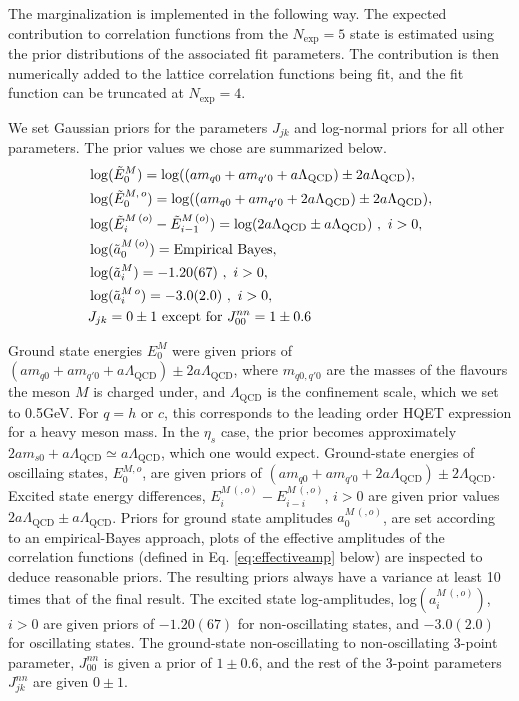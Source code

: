 The marginalization is implemented in the following way. The expected contribution to correlation functions from the $N_{\text{exp}}=5$ state is estimated using the prior distributions of the associated fit parameters. The contribution is then numerically added to the lattice correlation functions being fit, and the fit function can be truncated at $N_{\text{exp}}=4$.

We set Gaussian priors for the parameters $J_{jk}$ and log-normal priors for all other parameters. The prior values we chose are summarized below.
\begin{align}
  \nonumber
  &\log(\tilde{E}_0^M) = \log( (am_{q0}+am_{q'0}+a\Lambda_{\text{QCD}})\pm 2a\Lambda_{\text{QCD}} ), \\
  \nonumber
  &\log(\tilde{E}_0^{M,\,o}) = \log( (am_{q0}+am_{q'0}+2a\Lambda_{\text{QCD}})\pm 2a\Lambda_{\text{QCD}} ), \\
  \nonumber
  &\log(\tilde{E}_i^{M\, (o)} - \tilde{E}_{i-1}^{M\, (o)}) = \log( 2a\Lambda_{\text{QCD}} \pm a\Lambda_{\text{QCD}}) \,\,,\,\,i>0 , \\
  \nonumber
  &\log(\tilde{a}_0^{M\,(o)}) = \text{Empirical Bayes}, \\
  \nonumber
  &\log(\tilde{a}_i^{M}) = -1.20(67) \,\,,\,\,i>0, \\
  \nonumber
  &\log(\tilde{a}_i^{M\,o}) = -3.0(2.0) \,\,,\,\,i>0, \\
  &J_{jk} = 0\pm 1 \text{ except for } J_{00}^{nn}=1\pm 0.6
\end{align}

Ground state energies $E_0^M$ were given priors of $(am_{q0} + am_{q'0} + a\Lambda_{\text{QCD}} )\pm 2a\Lambda_{\text{QCD}}$, where $m_{q0,q'0}$ are the masses of the flavours the meson $M$ is charged under, and $\Lambda_{\text{QCD}}$ is the confinement scale, which we set to 0.5GeV. For $q=h$ or $c$, this corresponds to the leading order HQET expression for a heavy meson mass. In the $\eta_s$ case, the prior becomes approximately $2am_{s0} + a\Lambda_{\text{QCD}} \simeq a\Lambda_{\text{QCD}}$, which one would expect. Ground-state energies of oscillaing states, $E_0^{M,o}$, are given priors of $(am_{q0} + am_{q'0} + 2 a\Lambda_{\text{QCD}})\pm 2\Lambda_{\text{QCD}}$. Excited state energy differences, $E_i^{M\,(,o)}-E_{i-i}^{M\,(,o)}$, $i>0$ are given prior values $2a\Lambda_{\text{QCD}}\pm a\Lambda_{\text{QCD}}$. Priors for ground state amplitudes $a_0^{M\,(,o)}$, are set according to an empirical-Bayes approach, plots of the effective amplitudes of the correlation functions (defined in Eq. \ref{eq:effectiveamp} below) are inspected to deduce reasonable priors. The resulting priors always have a variance at least 10 times that of the final result. The excited state log-amplitudes, log$(a_i^{M\,(,o)})$,$i>0$ are given priors of $-1.20(67)$ for non-oscillating states, and $-3.0(2.0)$ for oscillating states. The ground-state non-oscillating to non-oscillating 3-point parameter, $J_{00}^{nn}$ is given a prior of $1\pm 0.6$, and the rest of the 3-point parameters $J_{jk}^{nn}$ are given $0\pm 1$.

